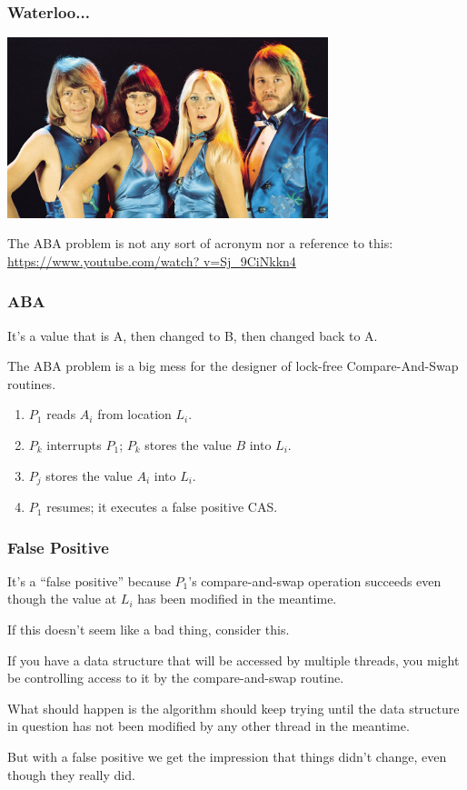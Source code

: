 \begin{frame}
\frametitle{Waterloo...}

\begin{center}
	\includegraphics[width=0.7\textwidth]{images/abba.jpeg}
\end{center}

The ABA problem is not any sort of acronym nor a reference to this: \url{https://www.youtube.com/watch? v=Sj_9CiNkkn4}


\end{frame}



\begin{frame}
\frametitle{ABA}

It's a value that is A, then changed to B, then changed back to A. 

The ABA problem is a big mess for the designer of lock-free Compare-And-Swap routines. 

\begin{enumerate}
	\item $P_{1}$ reads $A_{i}$ from location $L_{i}$.
	\item $P_{k}$ interrupts $P_{1}$; $P_{k}$ stores the value $B$ into $L_{i}$.
	\item $P_{j}$ stores the value $A_{i}$ into $L_{i}$.
	\item $P_{1}$ resumes; it executes a false positive CAS.
\end{enumerate} 


\end{frame}



\begin{frame}
\frametitle{False Positive}

It's a ``false positive'' because $P_{1}$'s compare-and-swap operation succeeds even though the value at $L_{i}$ has been modified in the meantime. 

If this doesn't seem like a bad thing, consider this. 

If you have a data structure that will be accessed by multiple threads, you might be controlling access to it by the compare-and-swap routine. 

What should happen is the algorithm should keep trying until the data structure in question has not been modified by any other thread in the meantime. 

But with a false positive we get the impression that things didn't change, even though they really did.

\end{frame}



